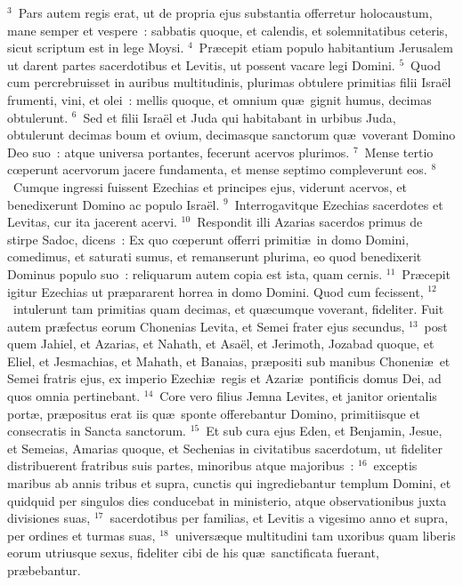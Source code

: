 ${}^{3}$~Pars autem regis erat, ut de propria ejus substantia offerretur holocaustum, mane semper et vespere~: sabbatis quoque, et calendis, et solemnitatibus ceteris, sicut scriptum est in lege Moysi.
${}^{4}$~Pr\ae cepit etiam populo habitantium Jerusalem ut darent partes sacerdotibus et Levitis, ut possent vacare legi Domini.
${}^{5}$~Quod cum percrebruisset in auribus multitudinis, plurimas obtulere primitias filii Isra\"el frumenti, vini, et olei~: mellis quoque, et omnium qu\ae\ gignit humus, decimas obtulerunt.
${}^{6}$~Sed et filii Isra\"el et Juda qui habitabant in urbibus Juda, obtulerunt decimas boum et ovium, decimasque sanctorum qu\ae\ voverant Domino Deo suo~: atque universa portantes, fecerunt acervos plurimos.
${}^{7}$~Mense tertio cœperunt acervorum jacere fundamenta, et mense septimo compleverunt eos.
${}^{8}$~Cumque ingressi fuissent Ezechias et principes ejus, viderunt acervos, et benedixerunt Domino ac populo Isra\"el.
${}^{9}$~Interrogavitque Ezechias sacerdotes et Levitas, cur ita jacerent acervi.
${}^{10}$~Respondit illi Azarias sacerdos primus de stirpe Sadoc, dicens~: Ex quo cœperunt offerri primiti\ae\ in domo Domini, comedimus, et saturati sumus, et remanserunt plurima, eo quod benedixerit Dominus populo suo~: reliquarum autem copia est ista, quam cernis.
${}^{11}$~Pr\ae cepit igitur Ezechias ut pr\ae pararent horrea in domo Domini. Quod cum fecissent,
${}^{12}$~intulerunt tam primitias quam decimas, et qu\ae cumque voverant, fideliter. Fuit autem pr\ae fectus eorum Chonenias Levita, et Semei frater ejus secundus,
${}^{13}$~post quem Jahiel, et Azarias, et Nahath, et Asa\"el, et Jerimoth, Jozabad quoque, et Eliel, et Jesmachias, et Mahath, et Banaias, pr\ae positi sub manibus Choneni\ae\ et Semei fratris ejus, ex imperio Ezechi\ae\ regis et Azari\ae\ pontificis domus Dei, ad quos omnia pertinebant.
${}^{14}$~Core vero filius Jemna Levites, et janitor orientalis port\ae , pr\ae positus erat iis qu\ae\ sponte offerebantur Domino, primitiisque et consecratis in Sancta sanctorum.
${}^{15}$~Et sub cura ejus Eden, et Benjamin, Jesue, et Semeias, Amarias quoque, et Sechenias in civitatibus sacerdotum, ut fideliter distribuerent fratribus suis partes, minoribus atque majoribus~:
${}^{16}$~exceptis maribus ab annis tribus et supra, cunctis qui ingrediebantur templum Domini, et quidquid per singulos dies conducebat in ministerio, atque observationibus juxta divisiones suas,
${}^{17}$~sacerdotibus per familias, et Levitis a vigesimo anno et supra, per ordines et turmas suas,
${}^{18}$~univers\ae que multitudini tam uxoribus quam liberis eorum utriusque sexus, fideliter cibi de his qu\ae\ sanctificata fuerant, pr\ae bebantur.
